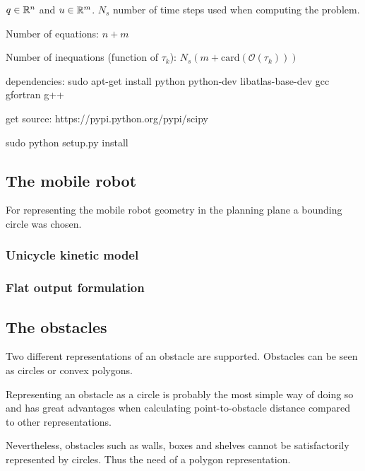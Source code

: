 $q \in \mathbb{R}^n$ and $u \in \mathbb{R}^m$. $N_s$ number of time steps used when computing the problem.

Number of equations: $n + m$

Number of inequations (function of $\tau_k$): $N_s(m+\mathrm{card}(\mathcal{O}(\tau_k)))$

dependencies:
sudo apt-get install python python-dev libatlas-base-dev gcc gfortran g++

get source:
https://pypi.python.org/pypi/scipy

sudo python setup.py install

\subsection{The mobile robot}

For representing the mobile robot geometry in the planning plane a bounding circle was chosen.

\subsubsection{Unicycle kinetic model}

\subsubsection{Flat output formulation}

\subsection{The obstacles}


Two different representations of an obstacle are supported. Obstacles can be seen as circles or convex polygons.

Representing an obstacle as a circle is probably the most simple way of doing so and has great advantages when
calculating point-to-obstacle distance compared to other representations.

Nevertheless, obstacles such as walls, boxes and shelves cannot be satisfactorily represented by circles.
Thus the need of a polygon representation.


